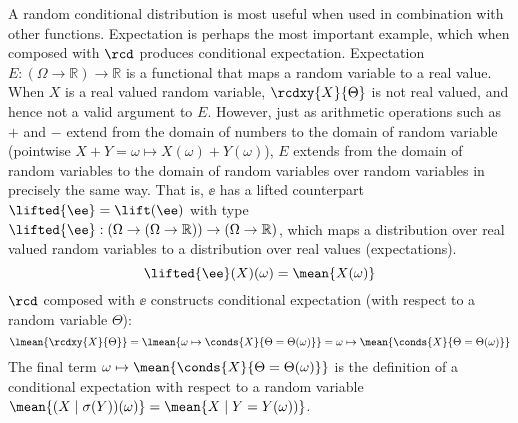 A random conditional distribution is most useful when used in combination with other functions.
Expectation is perhaps the most important example, which when composed with $\rcd$ produces conditional expectation.
Expectation $E : (\Omega \to \mathbb{R}) \to \mathbb{R}$ is a functional that maps a random variable to a real value.
When $X$ is a real valued random variable, $\rcdxy{X}{\Theta}$ is not real valued, and hence not a valid argument to $E$.
However, just as arithmetic operations such as $+$ and $-$ extend from the domain of numbers to the domain of random variable (pointwise	 $X + Y = \omega \mapsto X(\omega) + Y(\omega)$), $E$ extends from the domain of random variables to the domain of random variables over random variables in precisely the same way.
That is, $\ee$ has a lifted counterpart $\lifted{\ee} = \lift(\ee)$ with type $\lifted{\ee} : (\Omega \to (\Omega \to \mathbb{R})) \to (\Omega \to \mathbb{R})$, which maps a distribution over real valued random variables to a distribution over real values (expectations).
$$
\lifted{\ee}(X)(\omega) = \mean{X(\omega)}
$$
$\rcd$ composed with $\ee$ constructs conditional expectation (with respect to a random variable $\Theta$):
\begin{equation}
\lmean{\rcdxy{X}{\Theta}} = \lmean{\omega \mapsto \conds{X}{\Theta = \Theta(\omega)}} 
                    = \omega \mapsto \mean{\conds{X}{\Theta = \Theta(\omega)}}\\
\end{equation}
The final term $\omega \mapsto \mean{\conds{X}{\Theta = \Theta(\omega)}}$ is the definition of a conditional expectation with respect to a random variable $\mean{(X\mid \sigma (Y))(\omega)} = \mean{X \mid Y = Y(\omega))}$.


